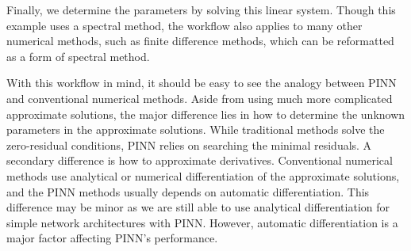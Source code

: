 Finally, we determine the parameters by solving this linear system.
Though this example uses a spectral method, the workflow also applies to many other numerical methods, such as finite difference methods, which can be reformatted as a form of spectral method.

With this workflow in mind, it should be easy to see the analogy between PINN and conventional numerical methods.
Aside from using much more complicated approximate solutions, the major difference lies in how to determine the unknown parameters in the approximate solutions.
While traditional methods solve the zero-residual conditions, PINN relies on searching the minimal residuals.
A secondary difference is how to approximate derivatives.
Conventional numerical methods use analytical or numerical differentiation of the approximate solutions, and the PINN methods usually depends on automatic differentiation.
This difference may be minor as we are still able to use analytical differentiation for simple network architectures with PINN.
However, automatic differentiation is a major factor affecting PINN's performance.

